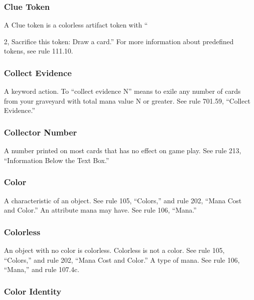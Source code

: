 {{{{\subsubsection*{Clue Token}

A Clue token is a colorless artifact token with “{2, Sacrifice this token: Draw a card.” For more information about predefined tokens, see rule 111.10.

\subsubsection*{Collect Evidence}

A keyword action. To “collect evidence N” means to exile any number of cards from your graveyard with total mana value N or greater. See rule 701.59, “Collect Evidence.”

\subsubsection*{Collector Number}

A number printed on most cards that has no effect on game play. See rule 213, “Information Below the Text Box.”

\subsubsection*{Color}

A characteristic of an object. See rule 105, “Colors,” and rule 202, “Mana Cost and Color.”
An attribute mana may have. See rule 106, “Mana.”

\subsubsection*{Colorless}

An object with no color is colorless. Colorless is not a color. See rule 105, “Colors,” and rule 202, “Mana Cost and Color.”
A type of mana. See rule 106, “Mana,” and rule 107.4c.

\subsubsection*{Color Identity}

}}}}}
